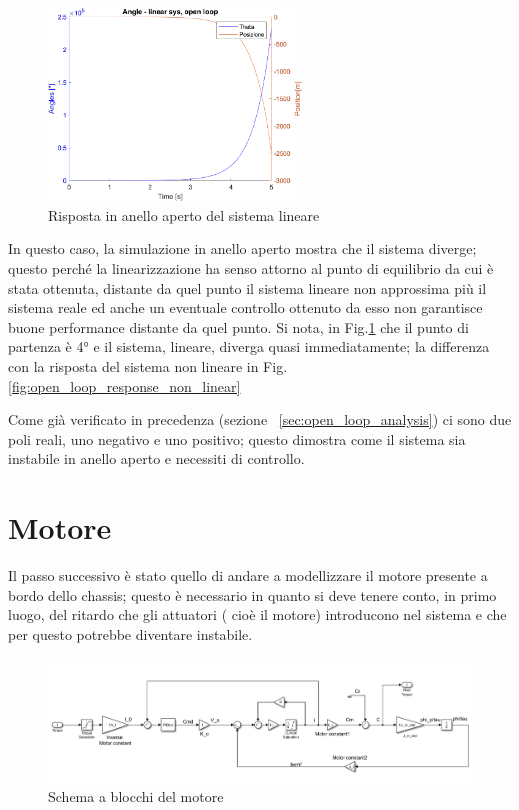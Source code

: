 \begin{figure}[H]
	\centering   	
	\includegraphics[width=0.6\textwidth]{Immagini/linear_open_loop.png}
	\caption{Risposta in anello aperto del sistema lineare}
	\label{fig:open_loop_response}
\end{figure}
In questo caso, la simulazione in anello aperto mostra che il sistema diverge; questo perché la linearizzazione ha senso attorno al punto di equilibrio da cui è stata ottenuta, distante da quel punto il sistema lineare non approssima più il sistema reale ed anche un eventuale controllo ottenuto da esso non garantisce buone performance distante da quel punto. Si nota, in Fig.\ref{fig:open_loop_response} che il punto di partenza è 4° e il sistema, lineare, diverga quasi immediatamente; la differenza con la risposta del sistema non lineare in Fig.\ref{fig:open_loop_response_non_linear}

Come già verificato in precedenza (sezione ~\ref{sec:open_loop_analysis}) ci sono due poli reali, uno negativo e uno positivo; questo dimostra come il sistema sia instabile in anello aperto e necessiti di controllo.

\section{Motore}
Il passo successivo è stato quello di andare a modellizzare il motore presente a bordo dello chassis; questo è necessario in quanto si deve tenere conto, in primo luogo, del ritardo che gli attuatori ( cioè il motore) introducono nel sistema e che per questo potrebbe diventare instabile.
\begin{figure}[H]
	\centering   	
	\includegraphics[width=1\textwidth]{Immagini/motor.png}
	\caption{Schema a blocchi del motore}
	\label{fig:motor}
\end{figure}

